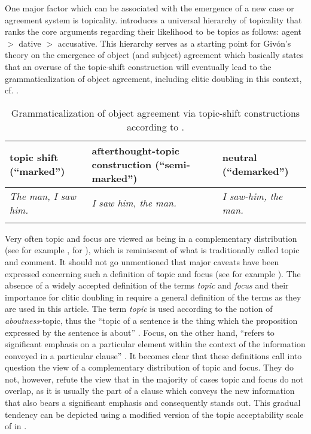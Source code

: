 \documentclass[output=paper]{langsci/langscibook}
\begin{document}
One major factor which can be associated with the emergence of a new case or agreement system is topicality. \citet[152]{Givon1976} introduces a universal hierarchy of topicality that ranks the core arguments regarding their likelihood to be topics as follows: agent $>$ dative $>$ accusative. This hierarchy serves as a starting point for Givón’s theory on the emergence of object (and subject) agreement which basically states that an overuse of the topic-shift construction will eventually lead to the grammaticalization of object agreement, including clitic doubling in this context, cf. .

\begin{table}
\begin{tabular}{L{.25\textwidth}L{.3\textwidth}L{.25\textwidth}}
\lsptoprule
topic shift (\enquote{marked}) & afterthought-topic construction (\enquote{semi-marked}) & neutral (\enquote{demarked})\\
\midrule
\textit{The man, I saw him.} & \textit{I saw him, the man.} & \textit{I saw-him, the man.}\\
\lspbottomrule
\end{tabular}
\caption{Grammaticalization of object agreement via topic-shift constructions according to \citet[157]{Givon1976}.\label{tab:matoshi:2}}
\end{table}

Very often topic and focus are viewed as being in a complementary distribution (see for example \citealt[538]{Buchholz1987}, \citealt[218]{Kallulli2000} for ), which is reminiscent of what is traditionally called topic and comment. It should not go unmentioned that major caveats have been expressed concerning such a definition of topic and focus (see for example \citealt[30]{Leafgren2002}). The absence of a widely accepted definition of the terms \textit{topic} and \textit{focus} and their importance for clitic doubling in  require a general definition of the terms as they are used in this article. The term \textit{topic} is used according to the notion of \textit{aboutness}-topic, thus the \enquote{topic of a sentence is the thing which the proposition expressed by the sentence is about} \citep[118]{Lambrecht1994}. Focus, on the other hand, \enquote{refers to significant emphasis on a particular element within the context of the information conveyed in a particular clause} \citep[23--24]{Leafgren2002}. It becomes clear that these definitions call into question the view of a complementary distribution of topic and focus. They do not, however, refute the view that in the majority of cases topic and focus do not overlap, as it is usually the part of a clause which conveys the new information that also bears a significant emphasis and consequently stands out. This gradual tendency can be depicted using a modified version of the topic acceptability scale of \citet[165]{Lambrecht1994} in .\largerpage[-1]
\end{document}
